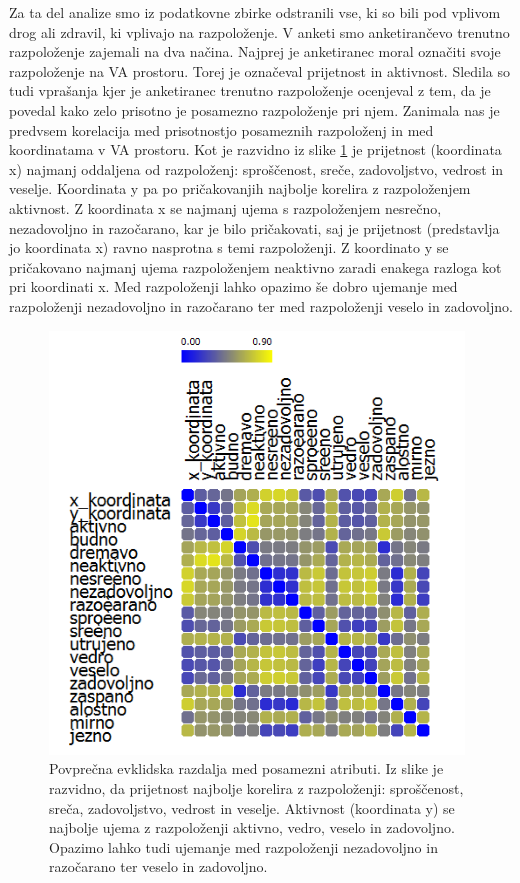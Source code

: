 \documentclass[a4paper, 12pt]{book}
\begin{document}
{Za ta del analize smo iz podatkovne zbirke odstranili vse, ki so bili pod vplivom drog ali zdravil, ki vplivajo na razpoloženje. V anketi smo anketirančevo trenutno razpoloženje zajemali na dva načina. Najprej je anketiranec moral označiti svoje razpoloženje na VA prostoru. Torej je označeval prijetnost in aktivnost. Sledila so tudi vprašanja kjer je anketiranec trenutno razpoloženje ocenjeval z tem, da je povedal kako zelo prisotno je posamezno razpoloženje pri njem. Zanimala nas je predvsem korelacija med prisotnostjo posameznih razpoloženj in med koordinatama v VA prostoru. Kot je razvidno iz slike \ref{prisotnost_kor} je prijetnost (koordinata x) najmanj oddaljena od razpoloženj: sproščenost, sreče, zadovoljstvo, vedrost in veselje. Koordinata y pa po pričakovanjih najbolje korelira z razpoloženjem aktivnost. Z koordinata x se najmanj ujema s razpoloženjem nesrečno, nezadovoljno in razočarano, kar je bilo pričakovati, saj je prijetnost (predstavlja jo koordinata x) ravno nasprotna s temi razpoloženji. Z koordinato y se pričakovano najmanj ujema razpoloženjem neaktivno zaradi enakega razloga kot pri koordinati x. Med razpoloženji lahko opazimo še dobro ujemanje med razpoloženji nezadovoljno in razočarano ter med razpoloženji veselo in zadovoljno. 

\begin{figure}[hbt]
\centering
\includegraphics[width=11cm]{images/korelacija_custva_pris.png}

\caption{Povprečna evklidska razdalja med posamezni atributi. Iz slike je razvidno, da prijetnost najbolje korelira z razpoloženji: sproščenost, sreča, zadovoljstvo, vedrost in veselje. Aktivnost (koordinata y) se najbolje ujema z razpoloženji aktivno, vedro, veselo in zadovoljno. Opazimo lahko tudi ujemanje med razpoloženji nezadovoljno in razočarano ter veselo in zadovoljno.}
\label{prisotnost_kor}
\end{figure}

}
\end{document}

